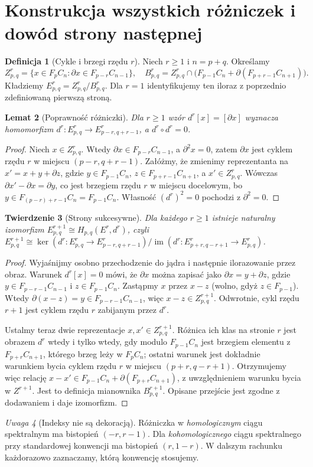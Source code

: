 \documentclass[11pt,a4paper,oneside]{report}
\theoremstyle{plain}
\newtheorem{twierdzenie}{Twierdzenie}[section]
\newtheorem{lemat}[twierdzenie]{Lemat}
\theoremstyle{definition}
\newtheorem{definicja}[twierdzenie]{Definicja}
\theoremstyle{remark}
\newtheorem{uwaga}[twierdzenie]{Uwaga}
\begin{document}
\section{Konstrukcja wszystkich różniczek i dowód strony następnej}
\begin{definicja}[Cykle i brzegi rzędu $r$]
Niech $r\ge1$ i $n=p+q$. Określamy
\[
Z^r_{p,q}=\{x\in F_pC_n:\partial x\in F_{p-r}C_{n-1}\},
\quad
B^r_{p,q}=Z^r_{p,q}\cap\bigl(F_{p-1}C_n+\partial(F_{p+r-1}C_{n+1})\bigr).
\]
Kładziemy $E^r_{p,q}=Z^r_{p,q}/B^r_{p,q}$.
Dla $r=1$ identyfikujemy ten iloraz z poprzednio zdefiniowaną
pierwszą stroną.
\end{definicja}
\begin{lemat}[Poprawność różniczki]
\label{lem:dr-v5}
Dla $r\ge1$ wzór $d^r[x]=[\partial x]$ wyznacza
homomorfizm
$d^r:E^r_{p,q}\to E^r_{p-r,q+r-1}$,
a $d^r\circ d^r=0$.
\end{lemat}
\begin{proof}
Niech $x\in Z^r_{p,q}$. Wtedy $\partial x\in F_{p-r}C_{n-1}$,
a $\partial^2x=0$, zatem $\partial x$ jest cyklem
rzędu $r$ w miejscu $(p-r,q+r-1)$. Załóżmy, że zmienimy
reprezentanta na $x'=x+y+\partial z$, gdzie
$y\in F_{p-1}C_n$, $z\in F_{p+r-1}C_{n+1}$,
a $x'\in Z^r_{p,q}$. Wówczas
$\partial x'-\partial x=\partial y$,
co jest brzegiem rzędu $r$ w miejscu docelowym, bo
$y\in F_{(p-r)+r-1}C_n=F_{p-1}C_n$.
Własność $(d^r)^2=0$ pochodzi z $\partial^2=0$.
\end{proof}
\begin{twierdzenie}[Strony sukcesywne]
\label{thm:pages-v5}
Dla każdego $r\ge1$ istnieje naturalny izomorfizm
$E^{r+1}_{p,q}\cong H_{p,q}(E^r,d^r)$, czyli
$E^{r+1}_{p,q}\cong\ker(d^r:E^r_{p,q}\to E^r_{p-r,q+r-1})/
\operatorname{im}(d^r:E^r_{p+r,q-r+1}\to E^r_{p,q})$.
\end{twierdzenie}
\begin{proof}
Wyjaśnijmy osobno przechodzenie do jądra i następnie
ilorazowanie przez obraz. Warunek $d^r[x]=0$ mówi, że
$\partial x$ można zapisać jako
$\partial x=y+\partial z$, gdzie
$y\in F_{p-r-1}C_{n-1}$ i $z\in F_{p-1}C_n$.
Zastąpmy $x$ przez $x-z$ (wolno, gdyż $z\in F_{p-1}$).
Wtedy $\partial(x-z)=y\in F_{p-r-1}C_{n-1}$,
więc $x-z\in Z^{r+1}_{p,q}$. Odwrotnie, cykl rzędu $r+1$
jest cyklem rzędu $r$ zabijanym przez $d^r$.

Ustalmy teraz dwie reprezentacje $x,x'\in Z^{r+1}_{p,q}$.
Różnica ich klas na stronie $r$ jest obrazem $d^r$
wtedy i tylko wtedy, gdy modulo $F_{p-1}C_n$ jest
brzegiem elementu z $F_{p+r}C_{n+1}$, którego brzeg
leży w $F_pC_n$; ostatni warunek jest dokładnie
warunkiem bycia cyklem rzędu $r$ w miejscu $(p+r,q-r+1)$.
Otrzymujemy więc relację
$x-x'\in F_{p-1}C_n+\partial(F_{p+r}C_{n+1})$,
z uwzględnieniem warunku bycia w $Z^{r+1}$.
Jest to definicja mianownika $B^{r+1}_{p,q}$.
Opisane przejście jest zgodne z dodawaniem i daje izomorfizm.
\end{proof}
\begin{uwaga}[Indeksy nie są dekoracją]
Różniczka w \emph{homologicznym} ciągu spektralnym ma
bistopień $(-r,r-1)$. Dla \emph{kohomologicznego} ciągu
spektralnego przy standardowej konwencji ma bistopień
$(r,1-r)$. W dalszym rachunku każdorazowo zaznaczamy,
którą konwencję stosujemy.
\end{uwaga}
\end{document}
